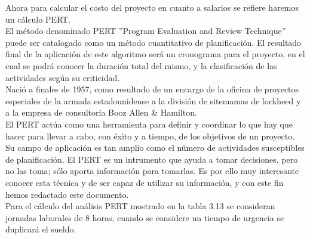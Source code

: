 \documentclass[12pt]{report}
\begin{document}
Ahora para calcular el costo del proyecto en cuanto a salarios se refiere haremos un cálculo PERT.\\
El método denominado PERT ''Program Evaluation and Review Technique'' puede ser catalogado como un método cuantitativo de planificación.
El resultado final de la aplicación de este algoritmo será un cronograma para el proyecto, en el cual se podrá conocer la duración total del mismo, y la clasificación de las actividades según su criticidad. \\

Nació a finales de 1957, como resultado de un encargo de la oficina de proyectos especiales de la armada estadounidense a la división de sitemamas de lockheed y a la empresa de consultoría Booz Allen \& Hamilton.\\

El PERT actúa como una herramienta para definir y coordinar lo que hay que hacer para llevar a cabo, con éxito y a tiempo, de los objetivos de un proyecto. Su campo de aplicación es tan amplio como el número de actividades susceptibles de planificación.
El PERT es un intrumento que ayuda a tomar decisiones, pero no las toma; sólo aporta información para tomarlas. Es por ello muy interesante conocer esta técnica y de ser capaz de utilizar su información, y con este fin hemos redactado este documento.\cite{pert} \\

Para el cálculo del análisis PERT mostrado en la tabla 3.13 se consideran jornadas laborales de 8 horas, cuando se considere un tiempo de urgencia se duplicará el sueldo.
\end{document}

